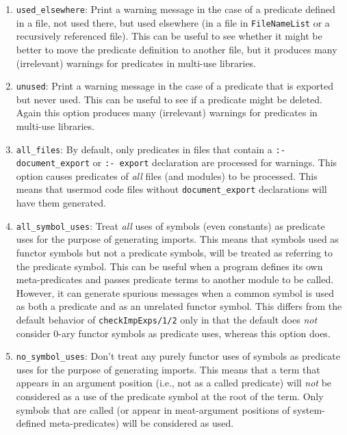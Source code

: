 \begin{description}
\begin{enumerate}
\item
   {\tt used\_elsewhere}: Print a warning message in the case of a
   predicate defined in a file, not used there, but used elsewhere (in
   a file in {\tt FileNameList} or a recursively referenced
   file). This can be useful to see whether it might be better to move
   the predicate definition to another file, but it produces many
   (irrelevant) warnings for predicates in multi-use libraries.
\item
   {\tt unused}: Print a warning message in the case of a predicate
   that is exported but never used.  This can be useful to see if a
   predicate might be deleted.  Again this option produces many
   (irrelevant) warnings for predicates in multi-use libraries.
\item
   {\tt all\_files}: By default, only predicates in files that contain
   a {\tt :- document\_export} or {\tt :- export} declaration are
   processed for warnings.  This option causes predicates of {\em all}
   files (and modules) to be processed.  This means that usermod code
   files without {\tt document\_export} declarations will have them
   generated.
\item
   {\tt all\_symbol\_uses}: Treat {\em all} uses of symbols (even
   constants) as predicate uses for the purpose of generating imports.
   This means that symbols used as functor symbols but not a predicate
   symbols, will be treated as referring to the predicate symbol.
   This can be useful when a program defines its own meta-predicates
   and passes predicate terms to another module to be called.
   However, it can generate spurious messages when a common symbol is
   used as both a predicate and as an unrelated functor symbol.  This
   differs from the default behavior of {\tt checkImpExps/1/2} only in
   that the default does {\em not} consider 0-ary functor symbols as
   predicate uses, whereas this option does.
\item
   {\tt no\_symbol\_uses}: Don't treat any purely functor uses of
   symbols as predicate uses for the purpose of generating imports.
   This means that a term that appears in an argument position (i.e.,
   not as a called predicate) will {\em not} be considered as a use of
   the predicate symbol at the root of the term.  Only symbols that
   are called (or appear in meat-argument positions of system-defined
   meta-predicates) will be considered as used.
\end{enumerate}


\end{description}
